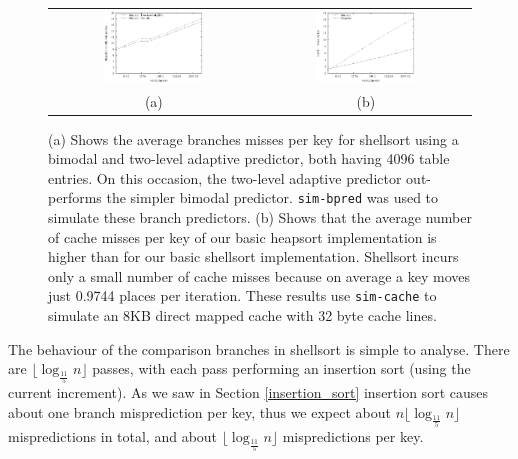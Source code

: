 \documentclass[acmtocl]{acmtrans2m}
\begin{document}
\begin{figure}
\centering
\begin{tabular}{cc}
\includegraphics[width=0.5\textwidth]{plots/shellsort_branch_misses.eps} & \includegraphics[width=0.5\textwidth]{plots/shell_heap_cache_misses.eps} \\
(a) & (b) \\
\end{tabular}
\caption{(a) Shows the average branches misses per key for shellsort using a bimodal and two-level adaptive predictor, both having 4096 table entries.
On this occasion, the two-level adaptive predictor out-performs the simpler bimodal predictor. \texttt{sim-bpred}
was used to simulate these branch predictors.
(b) Shows that the average number of cache misses per key of our basic heapsort implementation
is higher than for our basic shellsort implementation. Shellsort incurs only a small number of cache misses
because on average a key moves just 0.9744 places per iteration. These results use \texttt{sim-cache} to simulate
an 8KB direct mapped cache with 32 byte cache lines.}
\label{shellsort_results_figs}
\end{figure}

The behaviour of the comparison branches in shellsort is
simple to analyse. There are $\lfloor \log_\frac{11}{5} n \rfloor$ passes, with
each pass performing an insertion sort (using the current
increment). As we saw in Section \ref{insertion_sort} insertion
sort causes about one branch misprediction per key, thus
we expect about $n \lfloor \log_\frac{11}{5}n \rfloor$ mispredictions in total, and
about $\lfloor \log_\frac{11}{5}n \rfloor$ mispredictions per key. 
\end{document}
